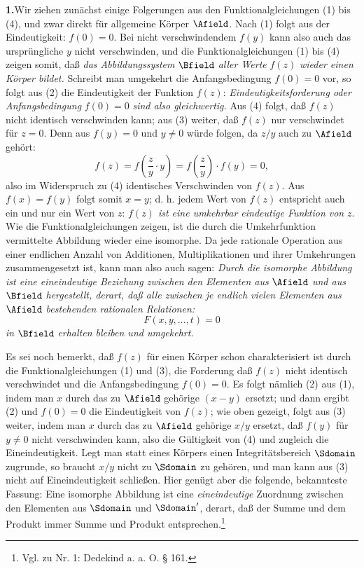 \documentclass[11pt]{article}
\begin{document}
\medskip
\noindent\textbf{1.}\quad Wir ziehen zunächst einige Folgerungen aus den Funktionalgleichungen (1) bis (4), und zwar direkt für allgemeine Körper \(\Afield\). Nach (1) folgt aus der Eindeutigkeit: \(f(0)=0\). Bei nicht verschwindendem \(f(y)\) kann also auch das ursprüngliche \(y\) nicht verschwinden, und die Funktionalgleichungen (1) bis (4) zeigen somit, daß \emph{das Abbildungssystem} \(\Bfield\) \emph{aller Werte} \(f(z)\) \emph{wieder einen Körper bildet.} Schreibt man umgekehrt die Anfangsbedingung \(f(0)=0\) vor, so folgt aus (2) die Eindeutigkeit der Funktion \(f(z)\): \emph{Eindeutigkeitsforderung oder Anfangsbedingung} \(f(0)=0\) \emph{sind also gleichwertig.} Aus (4) folgt, daß \(f(z)\) nicht identisch verschwinden kann; aus (3) weiter, daß \(f(z)\) nur verschwindet für \(z=0\). Denn aus \(f(y)=0\) und \(y\ne0\) würde folgen, da \(z/y\) auch zu \(\Afield\) gehört:
\[
f(z)=f\!\left(\frac{z}{y}\cdot y\right)=f\!\left(\frac{z}{y}\right)\cdot f(y)=0,
\]
also im Widerspruch zu (4) identisches Verschwinden von \(f(z)\). Aus \(f(x)=f(y)\) folgt somit \(x=y\); d. h. jedem Wert von \(f(z)\) entspricht auch ein und nur ein Wert von \(z\): \emph{\(f(z)\) ist eine umkehrbar eindeutige Funktion von} \(z\). Wie die Funktionalgleichungen zeigen, ist die durch die Umkehrfunktion vermittelte Abbildung wieder eine isomorphe. Da jede rationale Operation aus einer endlichen Anzahl von Additionen, Multiplikationen und ihrer Umkehrungen zusammengesetzt ist, kann man also auch sagen: \emph{Durch die isomorphe Abbildung ist eine eineindeutige Beziehung zwischen den Elementen aus} \(\Afield\) \emph{und aus} \(\Bfield\) \emph{hergestellt, derart, daß alle zwischen je endlich vielen Elementen aus} \(\Afield\) \emph{bestehenden rationalen Relationen:}
\[
F(x,y,\ldots,t)=0
\]
\emph{in} \(\Bfield\) \emph{erhalten bleiben und umgekehrt.}

Es sei noch bemerkt, daß \(f(z)\) für einen Körper schon charakterisiert ist durch die Funktionalgleichungen (1) und (3), die Forderung daß \(f(z)\) nicht identisch verschwindet und die Anfangsbedingung \(f(0)=0\). Es folgt nämlich (2) aus (1), indem man \(x\) durch das zu \(\Afield\) gehörige \((x-y)\) ersetzt; und dann ergibt (2) und \(f(0)=0\) die Eindeutigkeit von \(f(z)\); wie oben gezeigt, folgt aus (3) weiter, indem man \(x\) durch das zu \(\Afield\) gehörige \(x/y\) ersetzt, daß \(f(y)\) für \(y\ne0\) nicht verschwinden kann, also die Gültigkeit von (4) und zugleich die Eineindeutigkeit. Legt man statt eines Körpers einen Integritätsbereich \(\Sdomain\) zugrunde, so braucht \(x/y\) nicht zu \(\Sdomain\) zu gehören, und man kann aus (3) nicht auf Eineindeutigkeit schließen. Hier genügt aber die folgende, bekannteste Fassung: Eine isomorphe Abbildung ist eine \emph{eineindeutige} Zuordnung zwischen den Elementen aus \(\Sdomain\) und \(\Sdomain'\), derart, daß der Summe und dem Produkt immer Summe und Produkt entsprechen.\footnote{Vgl. zu Nr. 1: Dedekind a. a. O. § 161.}
\end{document}
